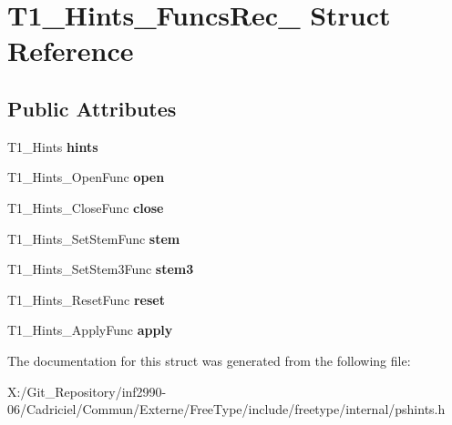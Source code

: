 \hypertarget{struct_t1___hints___funcs_rec__}{\section{T1\-\_\-\-Hints\-\_\-\-Funcs\-Rec\-\_\- Struct Reference}
\label{struct_t1___hints___funcs_rec__}
}
\subsection*{Public Attributes}
\begin{DoxyCompactItemize}
\item 
\hypertarget{struct_t1___hints___funcs_rec___a6a58f489e362b746703b4caae91349ef}{T1\-\_\-\-Hints {\bfseries hints}}\label{struct_t1___hints___funcs_rec___a6a58f489e362b746703b4caae91349ef}

\item 
\hypertarget{struct_t1___hints___funcs_rec___a41ca09a042c8e92f64822f19486a622a}{T1\-\_\-\-Hints\-\_\-\-Open\-Func {\bfseries open}}\label{struct_t1___hints___funcs_rec___a41ca09a042c8e92f64822f19486a622a}

\item 
\hypertarget{struct_t1___hints___funcs_rec___aa6d879215bff42f4b3851a9151c78505}{T1\-\_\-\-Hints\-\_\-\-Close\-Func {\bfseries close}}\label{struct_t1___hints___funcs_rec___aa6d879215bff42f4b3851a9151c78505}

\item 
\hypertarget{struct_t1___hints___funcs_rec___abdbf955a1fc9b19799ed8ea8137c9381}{T1\-\_\-\-Hints\-\_\-\-Set\-Stem\-Func {\bfseries stem}}\label{struct_t1___hints___funcs_rec___abdbf955a1fc9b19799ed8ea8137c9381}

\item 
\hypertarget{struct_t1___hints___funcs_rec___acc1edae831d279929f93c8eb1872daa3}{T1\-\_\-\-Hints\-\_\-\-Set\-Stem3\-Func {\bfseries stem3}}\label{struct_t1___hints___funcs_rec___acc1edae831d279929f93c8eb1872daa3}

\item 
\hypertarget{struct_t1___hints___funcs_rec___a5646878cdabd593389e28cffd8b077cb}{T1\-\_\-\-Hints\-\_\-\-Reset\-Func {\bfseries reset}}\label{struct_t1___hints___funcs_rec___a5646878cdabd593389e28cffd8b077cb}

\item 
\hypertarget{struct_t1___hints___funcs_rec___a3fb5f01de31da9efb2ae8f5251b4d506}{T1\-\_\-\-Hints\-\_\-\-Apply\-Func {\bfseries apply}}\label{struct_t1___hints___funcs_rec___a3fb5f01de31da9efb2ae8f5251b4d506}

\end{DoxyCompactItemize}


The documentation for this struct was generated from the following file\-:\begin{DoxyCompactItemize}
\item 
X\-:/\-Git\-\_\-\-Repository/inf2990-\/06/\-Cadriciel/\-Commun/\-Externe/\-Free\-Type/include/freetype/internal/pshints.\-h\end{DoxyCompactItemize}
